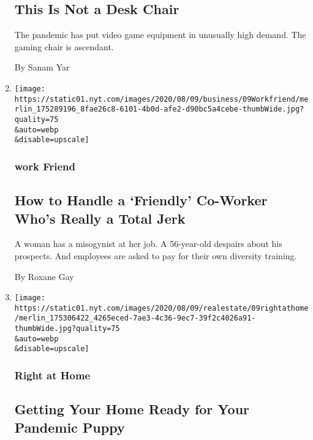 \begin{enumerate}
  \hypertarget{this-is-not-a-desk-chair-1}{%
  \subsection{This Is Not a Desk
  Chair}\label{this-is-not-a-desk-chair-1}}

  The pandemic has put video game equipment in unusually high demand.
  The gaming chair is ascendant.

  By Sanam Yar
\item
  \href{/2020/08/07/business/how-to-handle-a-friendly-co-worker-whos-really-a-total-jerk.html}{}

  \texttt{[image: https://static01.nyt.com/images/2020/08/09/business/09Workfriend/merlin\_175289196\_8fae26c8-6101-4b0d-afe2-d90bc5a4cebe-thumbWide.jpg?quality=75\\\&auto=webp\\\&disable=upscale]}

  \hypertarget{work-friend}{%
  \subsubsection{work Friend}\label{work-friend}}

  \hypertarget{how-to-handle-a-friendly-co-worker-whos-really-a-total-jerk}{%
  \subsection{How to Handle a `Friendly' Co-Worker Who's Really a Total
  Jerk}\label{how-to-handle-a-friendly-co-worker-whos-really-a-total-jerk}}

  A woman has a misogynist at her job. A 56-year-old despairs about his
  prospects. And employees are asked to pay for their own diversity
  training.

  By Roxane Gay
\item
  \href{/2020/08/07/realestate/pandemic-puppy-home-design.html}{}

  \texttt{[image: https://static01.nyt.com/images/2020/08/09/realestate/09rightathome/merlin\_175306422\_4265eced-7ae3-4c36-9ec7-39f2c4026a91-thumbWide.jpg?quality=75\\\&auto=webp\\\&disable=upscale]}

  \hypertarget{right-at-home}{%
  \subsubsection{Right at Home}\label{right-at-home}}

  \hypertarget{getting-your-home-ready-for-your-pandemic-puppy}{%
  \subsection{Getting Your Home Ready for Your Pandemic
  Puppy}\label{getting-your-home-ready-for-your-pandemic-puppy}}


\end{enumerate}

